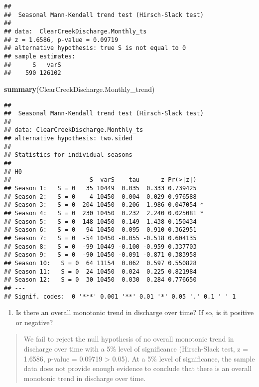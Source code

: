 \documentclass[]{article}
\newenvironment{Shaded}{\begin{snugshade}}{\end{snugshade}}
\newcommand{\KeywordTok}[1]{\textcolor[rgb]{0.13,0.29,0.53}{\textbf{#1}}}
\newcommand{\NormalTok}[1]{#1}
\providecommand{\tightlist}{%
  \setlength{\itemsep}{0pt}\setlength{\parskip}{0pt}}
\begin{document}
\begin{verbatim}
## 
##  Seasonal Mann-Kendall trend test (Hirsch-Slack test)
## 
## data:  ClearCreekDischarge.Monthly_ts
## z = 1.6586, p-value = 0.09719
## alternative hypothesis: true S is not equal to 0
## sample estimates:
##      S   varS 
##    590 126102
\end{verbatim}

\begin{Shaded}
\begin{Highlighting}[]
\KeywordTok{summary}\NormalTok{(ClearCreekDischarge.Monthly_trend)}
\end{Highlighting}
\end{Shaded}

\begin{verbatim}
## 
##  Seasonal Mann-Kendall trend test (Hirsch-Slack test)
## 
## data: ClearCreekDischarge.Monthly_ts
## alternative hypothesis: two.sided
## 
## Statistics for individual seasons
## 
## H0
##                      S  varS    tau      z Pr(>|z|)  
## Season 1:   S = 0   35 10449  0.035  0.333 0.739425  
## Season 2:   S = 0    4 10450  0.004  0.029 0.976588  
## Season 3:   S = 0  204 10450  0.206  1.986 0.047054 *
## Season 4:   S = 0  230 10450  0.232  2.240 0.025081 *
## Season 5:   S = 0  148 10450  0.149  1.438 0.150434  
## Season 6:   S = 0   94 10450  0.095  0.910 0.362951  
## Season 7:   S = 0  -54 10450 -0.055 -0.518 0.604135  
## Season 8:   S = 0  -99 10449 -0.100 -0.959 0.337703  
## Season 9:   S = 0  -90 10450 -0.091 -0.871 0.383958  
## Season 10:   S = 0  64 11154  0.062  0.597 0.550828  
## Season 11:   S = 0  24 10450  0.024  0.225 0.821984  
## Season 12:   S = 0  30 10450  0.030  0.284 0.776650  
## ---
## Signif. codes:  0 '***' 0.001 '**' 0.01 '*' 0.05 '.' 0.1 ' ' 1
\end{verbatim}

\begin{enumerate}
\def\labelenumi{\arabic{enumi}.}
\setcounter{enumi}{12}
\tightlist
\item
  Is there an overall monotonic trend in discharge over time? If so, is
  it positive or negative?
\end{enumerate}

\begin{quote}
We fail to reject the null hypothesis of no overall monotonic trend in
discharge over time with a 5\% level of significance (Hirsch-Slack test,
z = 1.6586, p-value = 0.09719 \textgreater{} 0.05). At a 5\% level of
significance, the sample data does not provide enough evidence to
conclude that there is an overall monotonic trend in discharge over
time.
\end{quote}
\end{document}
